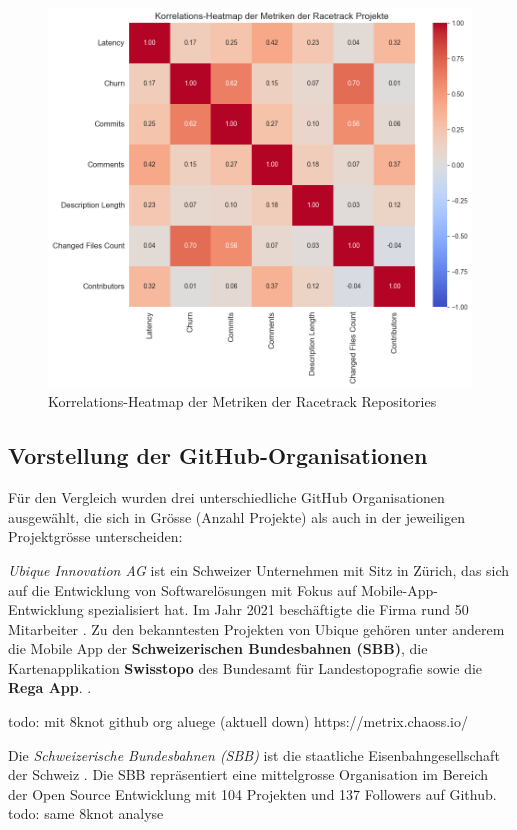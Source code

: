 \begin{figure}[htbp]
    \includegraphics[width=\textwidth]{Figures/racetrack-korrelationsmatrix.png}
    \caption{Korrelations-Heatmap der Metriken der Racetrack Repositories}
    \label{fig:korrelationsmatrix-racetrack}
\end{figure}

\subsection{Vorstellung der GitHub-Organisationen}
Für den Vergleich wurden drei unterschiedliche GitHub Organisationen ausgewählt, die sich in Grösse (Anzahl Projekte) als auch in der jeweiligen Projektgrösse unterscheiden:

\textit{Ubique Innovation AG} ist ein Schweizer Unternehmen mit Sitz in Zürich, das sich auf die Entwicklung von Softwarelösungen mit Fokus auf Mobile-App-Entwicklung spezialisiert hat. Im Jahr 2021 beschäftigte die Firma rund 50 Mitarbeiter \cite{noauthor_mathias_2021}. Zu den bekanntesten Projekten von Ubique gehören unter anderem die Mobile App der \textbf{Schweizerischen Bundesbahnen (SBB)}, die Kartenapplikation \textbf{Swisstopo} des Bundesamt für Landestopografie sowie die \textbf{Rega App}. \parencite{noauthor_apps_nodate}.

todo: mit 8knot github org aluege (aktuell down) 
https://metrix.chaoss.io/

Die \textit{Schweizerische Bundesbahnen (SBB)} ist die staatliche Eisenbahngesellschaft der Schweiz \parencite{uvek_schweizerische_nodate}. Die SBB repräsentiert eine mittelgrosse Organisation im Bereich der Open Source Entwicklung mit 104 Projekten und 137 Followers auf Github. \parencite{noauthor_swiss_nodate} 
todo: same 8knot analyse

